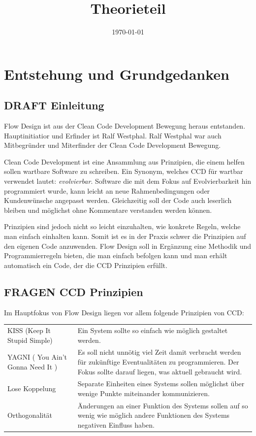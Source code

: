 \documentclass[a4paper,12pt,oneside]{book}
\date{\today}
\title{Theorieteil}
\begin{document}
\maketitle
\tableofcontents

\chapter{Entstehung und Grundgedanken}
\label{sec-1}

\section{DRAFT Einleitung}
\label{sec-1-1}

Flow Design ist aus der Clean Code Development Bewegung heraus entstanden. Hauptinitiatior und Erfinder ist Ralf Westphal.
Ralf Westphal war auch Mitbegründer und Miterfinder der Clean Code Development Bewegung.


Clean Code Development ist eine Ansammlung aus Prinzipien, die einem helfen
sollen wartbare Software zu schreiben. Ein Synonym, welches CCD für wartbar
verwendet lautet: \emph{evolvierbar}.
Software die mit dem Fokus auf Evolvierbarkeit hin programmiert wurde,
kann leicht an neue Rahmenbedingungen oder Kundenwünsche angepasst werden.
Gleichzeitig soll der Code auch leserlich bleiben und möglichst ohne Kommentare
verstanden werden können.

Prinzipien sind jedoch nicht so leicht einzuhalten, wie konkrete Regeln, welche man einfach einhalten kann.
Somit ist es in der Praxis schwer die Prinzipien auf den eigenen Code anzuwenden.
Flow Design soll in Ergänzung eine Methodik und Programmierregeln bieten, die man einfach befolgen kann und man erhält automatisch
ein Code, der die CCD Prinzipien erfüllt.

\section{FRAGEN CCD Prinzipien}
\label{sec-1-2}
Im Hauptfokus von Flow Design liegen vor allem folgende Prinzipien von CCD:

\begin{center}
	

\bgroup
\def\arraystretch{1.5}%
	\begin{tabularx}{\textwidth}{|p{5cm}|X|}
		\cline{1-2}
KISS (Keep It Stupid Simple) & Ein System sollte so einfach wie möglich gestaltet werden.\\ \cline{1-2}
YAGNI ( You Ain't Gonna Need It ) & Es soll nicht unnötig viel Zeit damit verbracht werden für zukünftige Eventualitäten zu programmieren. Der Fokus sollte darauf liegen, was aktuell gebraucht wird.\\ \cline{1-2}
Lose Koppelung & Separate Einheiten eines Systems sollen möglichst über  wenige Punkte miteinander kommunizieren.\\ \cline{1-2}
Orthogonalität & Änderungen an einer Funktion des Systems sollen auf so wenig wie möglich andere Funktionen des Systems negativen Einfluss haben.\\ \cline{1-2}
	\end{tabularx}
\egroup

\end{center}
\end{document}
